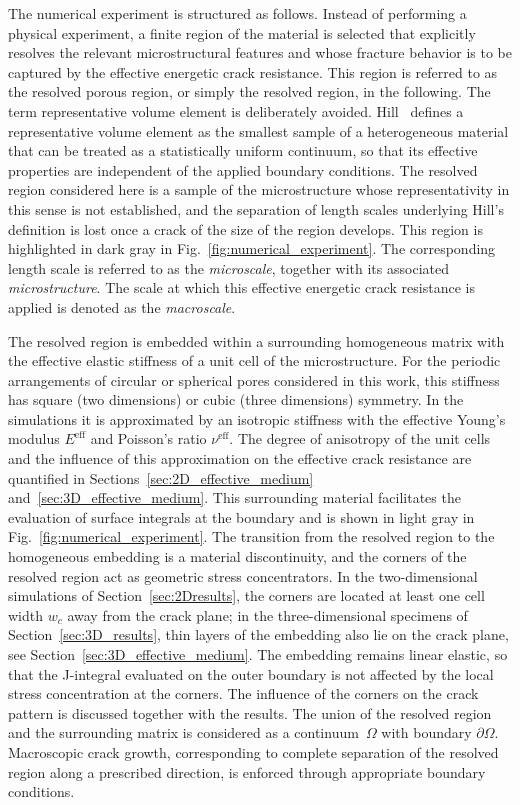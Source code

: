 \documentclass[pdflatex,sn-mathphys-num]{sn-jnl}%
\theoremstyle{thmstyleone}%
\theoremstyle{thmstyletwo}%
\theoremstyle{thmstylethree}%
\begin{document}
The numerical experiment is structured as follows.
Instead of performing a physical experiment, a finite region of the material
 is selected that explicitly resolves the relevant microstructural features and whose fracture behavior is to be captured by the effective energetic crack resistance.
This region is referred to as the resolved porous region, or simply the resolved region, in the following. The term representative volume element is deliberately avoided. Hill~\cite{hill_elastic_1963} defines a representative volume element as the smallest sample of a heterogeneous material that can be treated as a statistically uniform continuum, so that its effective properties are independent of the applied boundary conditions. The resolved region considered here is a sample of the microstructure whose representativity in this sense is not established, and the separation of length scales underlying Hill's definition is lost once a crack of the size of the region develops.
This region is highlighted in dark gray in Fig.~\ref{fig:numerical_experiment}.
The corresponding length scale is referred to as the \textsl{microscale}, together with its associated \textsl{microstructure}.
The scale at which this effective energetic crack resistance is applied is denoted as the \textsl{macroscale}.

The resolved region is embedded within a surrounding homogeneous matrix with the effective elastic stiffness of a unit cell of the microstructure. For the periodic arrangements of circular or spherical pores considered in this work, this stiffness has square (two dimensions) or cubic (three dimensions) symmetry. In the simulations it is approximated by an isotropic stiffness with the effective Young's modulus $E^{\text{eff}}$ and Poisson's ratio $\nu^{\text{eff}}$. The degree of anisotropy of the unit cells and the influence of this approximation on the effective crack resistance are quantified in Sections~\ref{sec:2D_effective_medium} and~\ref{sec:3D_effective_medium}.
This surrounding material facilitates the evaluation of surface integrals at the boundary and is shown in light gray in Fig.~\ref{fig:numerical_experiment}.
The transition from the resolved region to the homogeneous embedding is a material discontinuity, and the corners of the resolved region act as geometric stress concentrators. In the two-dimensional simulations of Section~\ref{sec:2Dresults}, the corners are located at least one cell width $w_c$ away from the crack plane; in the three-dimensional specimens of Section~\ref{sec:3D_results}, thin layers of the embedding also lie on the crack plane, see Section~\ref{sec:3D_effective_medium}. The embedding remains linear elastic, so that the J-integral evaluated on the outer boundary is not affected by the local stress concentration at the corners. The influence of the corners on the crack pattern is discussed together with the results.
The union of the resolved region and the surrounding matrix is considered as a continuum~$\Omega$ with boundary $\partial\Omega$.
Macroscopic crack growth, corresponding to complete separation of the resolved region along a prescribed direction, is enforced through appropriate boundary conditions.
\end{document}
